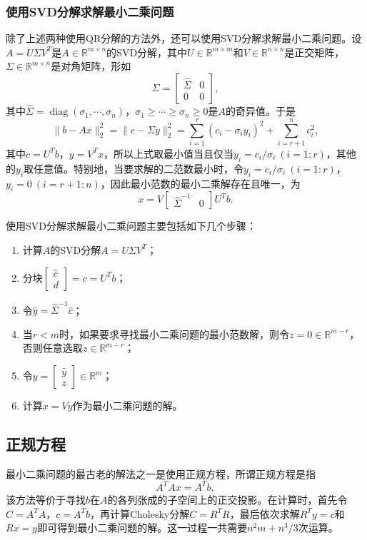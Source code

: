 \documentclass[a4paper,10pt]{ctexart}
\begin{document}
\subsubsection{使用SVD分解求解最小二乘问题}
除了上述两种使用QR分解的方法外，还可以使用SVD分解求解最小二乘问题。设$ A = U\Sigma V^T $是$ A\in \mathbb{R}^{m\times n} $的SVD分解，其中$ U\in \mathbb{R}^{m\times m} $和$ V\in \mathbb{R}^{n\times n} $是正交矩阵，$ \Sigma\in \mathbb{R}^{m\times n} $是对角矩阵，形如
\[
    \Sigma = \begin{bmatrix} 
        \hat{\Sigma} & 0\\
        0 & 0
    \end{bmatrix},
\]
其中$ \hat{\Sigma} = \operatorname{diag}(\sigma_1,\cdots ,\sigma_n) $，$ \sigma_1\geqslant \cdots \geqslant \sigma_n\geqslant 0 $是$ A $的奇异值。于是
\[
    \| b-Ax \|_2^2 = \| c-\Sigma y \|_2^2 = \sum_{i=1}^r (c_i-\sigma_i y_i)^2 + \sum_{i=r+1}^n c_i^2,
\]
其中$ c = U^T b $，$ y = V^T x $，所以上式取最小值当且仅当$ y_i = c_i/\sigma_i\ (i=1:r) $，其他的$ y_i $取任意值。特别地，当要求解的二范数最小时，令$ y_i = c_i/\sigma_i\ (i=1:r) $，$ y_i = 0\ (i=r+1:n) $，因此最小范数的最小二乘解存在且唯一，为
\[
    x = V\begin{bmatrix} 
        \hat{\Sigma}^{-1} & 0
    \end{bmatrix} U^T b.
\]

使用SVD分解求解最小二乘问题主要包括如下几个步骤：
\begin{enumerate}
    \item 计算$ A $的SVD分解$ A = U\Sigma V^T $；
    \item 分块$ \begin{bmatrix} 
        \hat{c}\\ d 
    \end{bmatrix} = c = U^T b $；
    \item 令$ \hat{y} = \hat{\Sigma}^{-1}\hat{c} $；
    \item 当$ r<m $时，如果要求寻找最小二乘问题的最小范数解，则令$ z=0\in \mathbb{R}^{m-r} $，否则任意选取$ z\in \mathbb{R}^{m-r} $；
    \item 令$ y = \begin{bmatrix} 
        \hat{y} \\ z
    \end{bmatrix}\in \mathbb{R}^m $；
    \item 计算$ x=Vy $作为最小二乘问题的解。
\end{enumerate}

\subsection{正规方程}
最小二乘问题的最古老的解法之一是使用正规方程，所谓正规方程是指
\begin{equation}
    A^T A x = A^T b,
\end{equation}
该方法等价于寻找$ b $在$ A $的各列张成的子空间上的正交投影。在计算时，首先令$ C=A^TA $，$ c=A^T b $，再计算Cholesky分解$ C = R^T R $，最后依次求解$ R^T y = c $和$ Rx = y $即可得到最小二乘问题的解。这一过程一共需要$ n^2m + n^3 / 3 $次运算。
\end{document}
